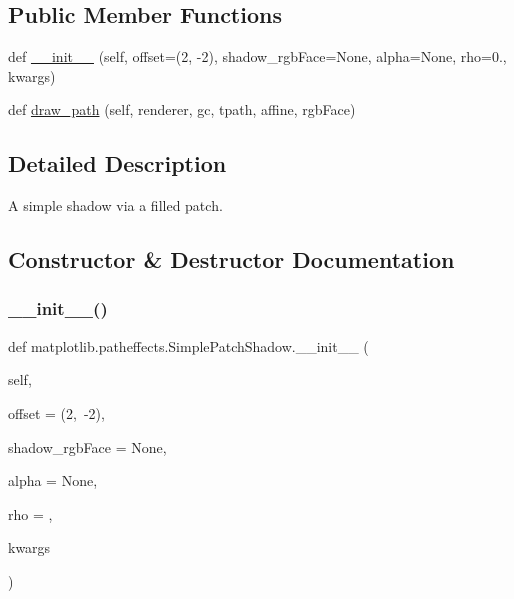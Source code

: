 \subsection*{Public Member Functions}
\begin{DoxyCompactItemize}
\item 
def \hyperlink{classmatplotlib_1_1patheffects_1_1SimplePatchShadow_a139118514d0c69558cbb7b5ee3c744a3}{\+\_\+\+\_\+init\+\_\+\+\_\+} (self, offset=(2, -\/2), shadow\+\_\+rgb\+Face=None, alpha=None, rho=0., kwargs)
\item 
def \hyperlink{classmatplotlib_1_1patheffects_1_1SimplePatchShadow_a2348709dab173deb5a2ac085acf86161}{draw\+\_\+path} (self, renderer, gc, tpath, affine, rgb\+Face)
\end{DoxyCompactItemize}


\subsection{Detailed Description}
\begin{DoxyVerb}A simple shadow via a filled patch.\end{DoxyVerb}
 

\subsection{Constructor \& Destructor Documentation}
\mbox{\label{classmatplotlib_1_1patheffects_1_1SimplePatchShadow_a139118514d0c69558cbb7b5ee3c744a3}} 
\subsubsection{\texorpdfstring{\+\_\+\+\_\+init\+\_\+\+\_\+()}{\_\_init\_\_()}}
{\footnotesize\ttfamily def matplotlib.\+patheffects.\+Simple\+Patch\+Shadow.\+\_\+\+\_\+init\+\_\+\+\_\+ (\begin{DoxyParamCaption}\item[{}]{self,  }\item[{}]{offset = {\ttfamily (2,~-\/2)},  }\item[{}]{shadow\+\_\+rgb\+Face = {\ttfamily None},  }\item[{}]{alpha = {\ttfamily None},  }\item[{}]{rho = {},  }\item[{}]{kwargs }\end{DoxyParamCaption})}

